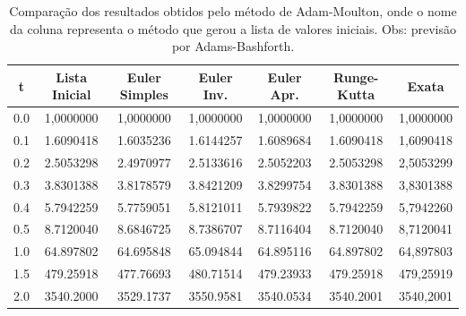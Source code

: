 \documentclass{article}
\begin{document}
\begin{otherlanguage}{brazil}
    \begin{table}[!htbp] 
    \centering
     \begin{tabular}{||c c c c c c c||} 
     \hline
     t & Lista Inicial & Euler Simples & Euler Inv. & Euler Apr. & Runge-Kutta & Exata \\ [0.5ex] 
     \hline\hline
     0.0 & 1,0000000 & 1,0000000 & 1,0000000 & 1,0000000 & 1,0000000 & 1,0000000 \\
     0.1 & 1.6090418 & 1.6035236 & 1.6144257 & 1.6089684 & 1.6090418 & 1,6090418 \\ 
     0.2 & 2.5053298 & 2.4970977 & 2.5133616 & 2.5052203 & 2.5053298 & 2,5053299 \\
     0.3 & 3.8301388 & 3.8178579 & 3.8421209 & 3.8299754 & 3.8301388 & 3,8301388 \\
     0.4 & 5.7942259 & 5.7759051 & 5.8121011 & 5.7939822 & 5.7942259 & 5,7942260 \\
     0.5 & 8.7120040 & 8.6846725 & 8.7386707 & 8.7116404 & 8.7120040 & 8,7120041 \\
     1.0 & 64.897802 & 64.695848 & 65.094844 & 64.895116 & 64.897802 & 64,897803 \\
     1.5 & 479.25918 & 477.76693 & 480.71514 & 479.23933 & 479.25918 & 479,25919 \\
     2.0 & 3540.2000 & 3529.1737 & 3550.9581 & 3540.0534 & 3540.2001 & 3540,2001 \\ [1ex]
     \hline
     \end{tabular}
     \caption{Comparação dos resultados obtidos pelo método de Adam-Moulton, onde o nome da coluna representa o método que gerou a lista de valores iniciais. Obs: previsão por Adams-Bashforth.}
     \label{table:3}
    \end{table}
    
    \newpage
    

\end{otherlanguage}
\end{document}
